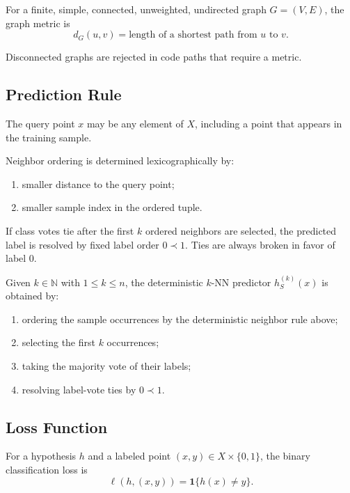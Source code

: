 \begin{definition}
For a finite, simple, connected, unweighted, undirected graph $G = (V, E)$, the graph metric is
\[
d_G(u, v) = \text{length of a shortest path from } u \text{ to } v.
\]
\end{definition}

Disconnected graphs are rejected in code paths that require a metric.

\subsection{Prediction Rule}

The query point $x$ may be any element of $X$, including a point that appears in the training sample.

\begin{note}
Neighbor ordering is determined lexicographically by:
\begin{enumerate}
    \item smaller distance to the query point;
    \item smaller sample index in the ordered tuple.
\end{enumerate}
If class votes tie after the first $k$ ordered neighbors are selected, the predicted label is resolved by fixed label order $0 \prec 1$. Ties are always broken in favor of label $0$.
\end{note}

\begin{definition}[$k$-NN Prediction]
Given $k \in \mathbb{N}$ with $1 \le k \le n$, the deterministic $k$-NN predictor $h_S^{(k)}(x)$ is obtained by:
\begin{enumerate}
    \item ordering the sample occurrences by the deterministic neighbor rule above;
    \item selecting the first $k$ occurrences;
    \item taking the majority vote of their labels;
    \item resolving label-vote ties by $0 \prec 1$.
\end{enumerate}
\end{definition}

\subsection{Loss Function}

\begin{definition}
For a hypothesis $h$ and a labeled point $(x, y) \in X \times \{0,1\}$, the binary classification loss is
\[
\ell(h, (x, y)) = \mathbf{1}\{h(x) \ne y\}.
\]
\end{definition}

